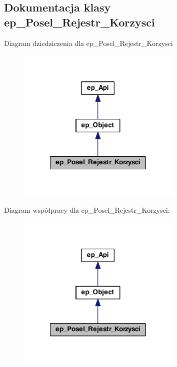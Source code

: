 \hypertarget{classep___posel___rejestr___korzysci}{\subsection{Dokumentacja klasy ep\-\_\-\-Posel\-\_\-\-Rejestr\-\_\-\-Korzysci}
\label{classep___posel___rejestr___korzysci}
}


Diagram dziedziczenia dla ep\-\_\-\-Posel\-\_\-\-Rejestr\-\_\-\-Korzysci\nopagebreak
\begin{figure}[H]
\begin{center}
\leavevmode
\includegraphics[width=222pt]{classep___posel___rejestr___korzysci__inherit__graph}
\end{center}
\end{figure}


Diagram współpracy dla ep\-\_\-\-Posel\-\_\-\-Rejestr\-\_\-\-Korzysci\-:\nopagebreak
\begin{figure}[H]
\begin{center}
\leavevmode
\includegraphics[width=222pt]{classep___posel___rejestr___korzysci__coll__graph}
\end{center}
\end{figure}
